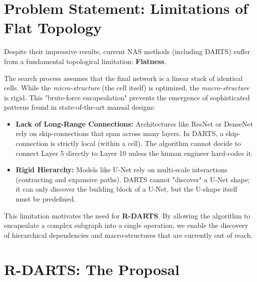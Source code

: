 \documentclass[a4paper,11pt]{article}
\begin{document}
\section{Problem Statement: Limitations of Flat Topology}
Despite their impressive results, current NAS methods (including DARTS) suffer from a fundamental topological limitation: \textbf{Flatness}.

The search process assumes that the final network is a linear stack of identical cells. While the \emph{micro-structure} (the cell itself) is optimized, the \emph{macro-structure} is rigid. This "brute-force encapsulation" prevents the emergence of sophisticated patterns found in state-of-the-art manual designs:

\begin{itemize}
    \item \textbf{Lack of Long-Range Connections:} Architectures like ResNet or DenseNet rely on skip-connections that span across many layers. In DARTS, a skip-connection is strictly local (within a cell). The algorithm cannot decide to connect Layer 5 directly to Layer 10 unless the human engineer hard-codes it.
    \item \textbf{Rigid Hierarchy:} Models like U-Net rely on multi-scale interactions (contracting and expansive paths). DARTS cannot "discover" a U-Net shape; it can only discover the building block of a U-Net, but the U-shape itself must be predefined.
\end{itemize}

This limitation motivates the need for \textbf{R-DARTS}. By allowing the algorithm to encapsulate a complex subgraph into a single operation, we enable the discovery of hierarchical dependencies and macro-structures that are currently out of reach.

\section{R-DARTS: The Proposal}
\end{document}
